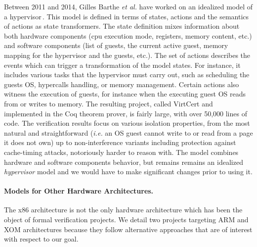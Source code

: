 Between 2011 and 2014, Gilles Barthe \emph{et al.} have worked on an idealized
model of a
hypervisor\,\cite{barthe2011virtcert1,barthe2012virtcert2,barthe2014virtcert3}.
%
This model is defined in terms of states, actions and the semantics of actions
as state trans\-formers.
%
The state definition mixes information about both hardware components (\ac{cpu}
execution mode, registers, memory content, etc.) and software components (list
of guests, the current active guest, memory mapping for the hypervisor and the
guests, etc.).
%
The set of actions describes the events which can trigger a transformation of
the model states.
%
For instance, it includes various tasks that the hypervisor must carry out, such
as scheduling the guests OS, hypercalls handling, or memory management.
%
Certain actions also witness the execution of guests, for instance when the
executing guest OS reads from or writes to memory.
%
The resulting project, called VirtCert and implemented in the Coq theorem
prover, is fairly large, with over 50,000 lines of code.
%
The verification results focus on various isolation properties, from the most
natural and straightforward (\emph{i.e.} an OS guest cannot write to or read
from a page it does not own) up to non-interference variants including
protection against cache-timing attacks, notoriously harder to reason with.
%
The model combines hardware and software components behavior, but remains
remains an idealized \emph{hypervisor} model and we would have to make
significant changes prior to using it.
%

\paragraph{Models for Other Hardware Architectures.}
%
The x86 architecture is not the only hardware architecture which has been the
object of formal verification projects.
%
We detail two projects targeting ARM and XOM architectures because they follow
alternative approaches that are of interest with respect to our goal.

